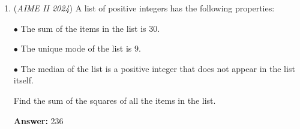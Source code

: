 \begin{enumerate}
 



\textbf{Solution 3}

Let $a$ be the number of people who have exactly one of these things and let $b$ be the number of people who have exactlty four of these objects. We have $a + 437 + 234 + d = 900,$ so $a + d = 229.$

 
Including those who have more than one object, we have
 \[195 + 367 + 562 + 900 = a + 2\cdot 437 + 3\cdot 234 + 4d.\]This is because we count those who own exactly $2$ objects twice, those who own $3$ thrice, and those who own $4$ four times. Solving gives $a + 4d = 448.$

 
Solving the system $a + 4d = 448, a + d = 229$ gives $3d = 219,$ so $d = \boxed{\textbf{(073)}}.$

 
-Benedict T (countmath1)

 



\textbf{Solution 4}

Let $A_1,A_2,\ldots, A_n$ be sets. Define
 \[S_k=\sum_{1\le a_1< a_2< \ldots < a_k\le n}\bigcup_{1\le i\le k}\lvert A_{a_i}\rvert\]Recall the formula for the number of elements that are in exactly $m$ of those sets.
 \[f(m)=\sum_{m=k}^{n}(-1)^{m-k}\binom{m}{k}S_m\]For $n=4$, let $A=S_1,B=S_2,C=S_3,D=S_4$. We see that $A=195+367+562+900=2024$. By the Inclusion-Exclusion Principle, and plugging-in $m=2,3$ for the above formula, we obtain the following equations:\begin{align*}A-B+C-D&=900\\B-3C+6D&=437\\C-4D&=234\end{align*}
Solving yields $D=\boxed{073}$.

 


	\item (\textit{AIME II 2024}) A list of positive integers has the following properties:


 $\bullet$ The sum of the items in the list is $30$.


 $\bullet$ The unique mode of the list is $9$.


 $\bullet$ The median of the list is a positive integer that does not appear in the list itself.


 Find the sum of the squares of all the items in the list.


 
 \textbf{Answer: }236




\end{enumerate}
